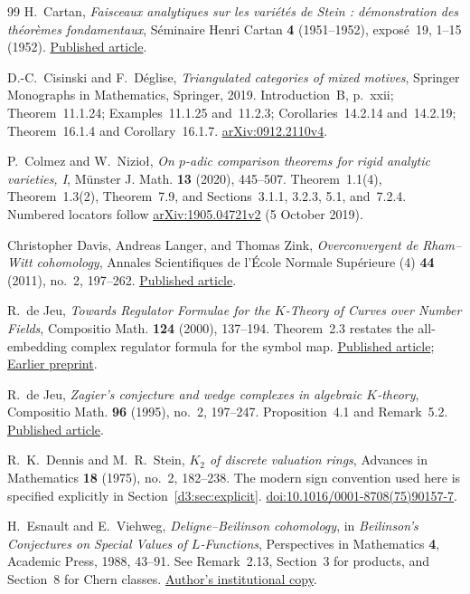 \begin{thebibliography}{99}
H.~Cartan,
\emph{Faisceaux analytiques sur les vari\'et\'es de Stein :
d\'emonstration des th\'eor\`emes fondamentaux},
S\'eminaire Henri Cartan \textbf{4} (1951--1952),
expos\'e~19, 1--15 (1952).
\href{https://numdam.org/item/SHC_1951-1952__4__A19_0/}{Published article}.

D.-C.~Cisinski and F.~D\'eglise,
\emph{Triangulated categories of mixed motives},
Springer Monographs in Mathematics, Springer, 2019.
Introduction~B, p.~xxii; Theorem~11.1.24;
Examples~11.1.25 and~11.2.3; Corollaries~14.2.14 and~14.2.19;
Theorem~16.1.4 and Corollary~16.1.7.
\href{https://arxiv.org/abs/0912.2110v4}{arXiv:0912.2110v4}.

P.~Colmez and W.~Nizio\l, \emph{On $p$-adic comparison theorems for rigid analytic varieties, I},
M\"unster J. Math. \textbf{13} (2020), 445--507.
Theorem~1.1(4), Theorem~1.3(2), Theorem~7.9, and
Sections~3.1.1, 3.2.3, 5.1, and~7.2.4.
Numbered locators follow
\href{https://arxiv.org/abs/1905.04721v2}{arXiv:1905.04721v2}
(5 October 2019).

Christopher Davis, Andreas Langer, and Thomas Zink,
\emph{Overconvergent de Rham--Witt cohomology},
Annales Scientifiques de l'\'Ecole Normale Sup\'erieure (4)
\textbf{44} (2011), no.~2, 197--262.
\href{https://www.numdam.org/item/10.24033/asens.2143.pdf}{Published article}.

R.~de Jeu, \emph{Towards Regulator Formulae for the $K$-Theory of Curves over Number Fields}, Compositio Math. \textbf{124} (2000), 137--194. Theorem~2.3 restates the all-embedding complex regulator formula for the symbol map.
\href{https://doi.org/10.1023/A:1026440915009}{Published article};
\href{https://arxiv.org/abs/math/9811192}{Earlier preprint}.

R.~de Jeu, \emph{Zagier's conjecture and wedge complexes in algebraic $K$-theory}, Compositio Math. \textbf{96} (1995), no.~2, 197--247. Proposition~4.1 and Remark~5.2.
\href{https://www.numdam.org/article/CM_1995__96_2_197_0.pdf}{Published article}.

R.~K.~Dennis and M.~R.~Stein, \emph{$K_2$ of discrete valuation rings}, Advances in Mathematics \textbf{18} (1975), no.~2, 182--238. The modern sign convention used here is specified explicitly in Section~\ref{d3:sec:explicit}.
\href{https://doi.org/10.1016/0001-8708(75)90157-7}{doi:10.1016/0001-8708(75)90157-7}.

H.~Esnault and E.~Viehweg, \emph{Deligne--Beilinson cohomology}, in \emph{Beilinson's Conjectures on Special Values of $L$-Functions}, Perspectives in Mathematics \textbf{4}, Academic Press, 1988, 43--91. See Remark~2.13, Section~3 for products, and Section~8 for Chern classes.
\href{https://page.mi.fu-berlin.de/esnault/preprints/helene/13-deligne_beilinson.pdf}{Author's institutional copy}.


\end{thebibliography}
